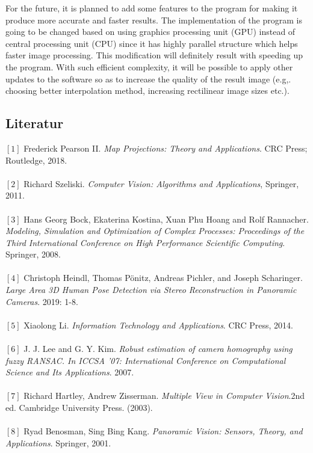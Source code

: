 \documentclass{article}
\begin{document}
For the future, it is planned to add some features to the program for making it produce more accurate and faster results. The implementation of the program is going to be changed based on using graphics processing unit (GPU) instead of central processing unit (CPU) since it has highly parallel structure which helps faster image processing. This modification will definitely result with speeding up the program. With such efficient complexity, it will be possible to apply other updates to the software so as to increase the quality of the result image (e.g,. choosing better interpolation method, increasing rectilinear image sizes etc.). 
\newpage
\begin{center}
\section*{Literatur}
\end{center} 
$[1]$ Frederick Pearson II. \textit{Map Projections: Theory and Applications}. CRC Press; Routledge, 2018.\\~\\
$[2]$ Richard Szeliski. \textit{Computer Vision: Algorithms and Applications}, Springer, 2011. \\~\\
$[3]$ Hans Georg Bock, Ekaterina Kostina, Xuan Phu Hoang and Rolf Rannacher. \textit{Modeling, Simulation and Optimization of Complex Processes: Proceedings of the Third International Conference on High Performance Scientific Computing}. Springer, 2008. \\~\\
$[4]$ Christoph Heindl, Thomas Pönitz, Andreas Pichler, and Joseph Scharinger. \textit{Large Area 3D Human Pose Detection via Stereo Reconstruction in Panoramic Cameras}. 2019: 1-8.\\~\\
$[5]$ Xiaolong Li. \textit{Information Technology and Applications}. CRC Press, 2014.\\~\\
$[6]$ J. J. Lee and G. Y. Kim. \textit{Robust estimation of camera homography using fuzzy RANSAC. In ICCSA ’07: International Conference on Computational Science and Its Applications}. 2007.\\~\\
$[7]$ Richard Hartley, Andrew Zisserman. \textit{Multiple View in Computer Vision}.2nd ed. 
Cambridge University Press. (2003).\\~\\
$[8]$ Ryad Benosman, Sing Bing Kang. \textit{Panoramic Vision: Sensors, Theory, and Applications}. Springer, 2001.\\~\\
\end{document}
